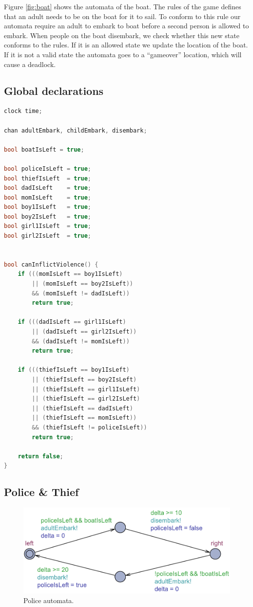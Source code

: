 \documentclass[a4paper,12pt]{scrartcl}
\begin{document}
Figure \ref{fig:boat} shows the automata of the boat. The rules of the game defines that an adult needs to be on the boat for it to sail. To conform to this rule our automata require an adult to embark to boat before a second person is allowed to embark. When people on the boat disembark, we check whether this new state conforms to the rules. If it is an allowed state we update the location of the boat. If it is not a valid state the automata goes to a ``gameover'' location, which will cause a deadlock.


\subsection*{Global declarations}

\begin{lstlisting}[language=CPP, label = lst:plugin_example, caption = Global declaration.]
clock time;

chan adultEmbark, childEmbark, disembark;

bool boatIsLeft = true;

bool policeIsLeft = true;
bool thiefIsLeft  = true;
bool dadIsLeft    = true;
bool momIsLeft    = true;
bool boy1IsLeft   = true;
bool boy2IsLeft   = true;
bool girl1IsLeft  = true;
bool girl2IsLeft  = true;


bool canInflictViolence() {
    if (((momIsLeft == boy1IsLeft)
    	|| (momIsLeft == boy2IsLeft))
    	&& (momIsLeft != dadIsLeft))
        return true;

    if (((dadIsLeft == girl1IsLeft)
    	|| (dadIsLeft == girl2IsLeft))
    	&& (dadIsLeft != momIsLeft))
        return true;

    if (((thiefIsLeft == boy1IsLeft)
    	|| (thiefIsLeft == boy2IsLeft)
    	|| (thiefIsLeft == girl1IsLeft)
    	|| (thiefIsLeft == girl2IsLeft)
    	|| (thiefIsLeft == dadIsLeft)
    	|| (thiefIsLeft == momIsLeft))
    	&& (thiefIsLeft != policeIsLeft))
        return true;

    return false;
}
\end{lstlisting}

\subsection*{Police \& Thief}

\begin{figure}[h!]
\centering
\includegraphics[width=0.7\linewidth]{Police.pdf}
\caption{Police automata.}
\label{fig:police}
\end{figure}
\end{document}
